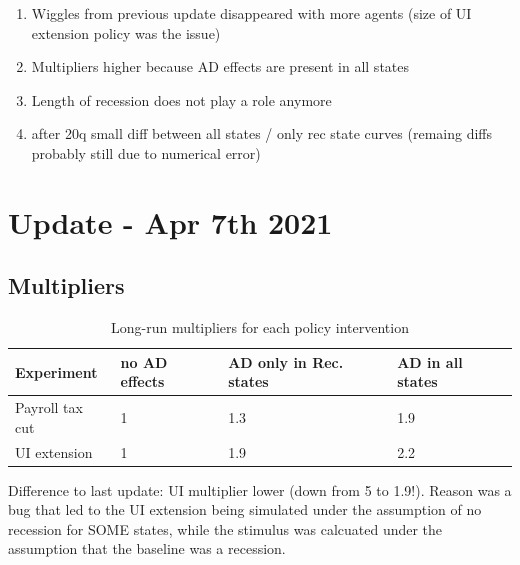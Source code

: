 \documentclass[]{article}
\begin{document}
\begin{enumerate}
	\item Wiggles from previous update disappeared with more agents (size of UI extension policy was the issue)
	\item Multipliers higher because AD effects are present in all states
	\item Length of recession does not play a role anymore
	\item after 20q small diff between all states / only rec state curves (remaing diffs probably still due to numerical error)
\end{enumerate}

	
\section{Update - Apr 7th 2021}

\subsection{Multipliers}
\begin{table}[htb]
	\centering
	\begin{tabular}{@{}llll@{}}
		\toprule
		Experiment  	& no AD effects & AD only in Rec. states 	& AD in all states \\ \midrule
		Payroll tax cut & 1 			& 1.3   			& 1.9  \\
		UI extension    & 1 			& 1.9 				& 2.2     \\ \bottomrule
	\end{tabular}	
	\caption{Long-run multipliers for each policy intervention }
	\label{tab:NPVADelas}
\end{table}

Difference to last update: UI multiplier lower (down from 5 to 1.9!). Reason was a bug that led to the UI extension being simulated under the assumption of no recession for SOME states, while the stimulus was calcuated under the assumption that the baseline was a recession.

\FloatBarrier
\end{document}
